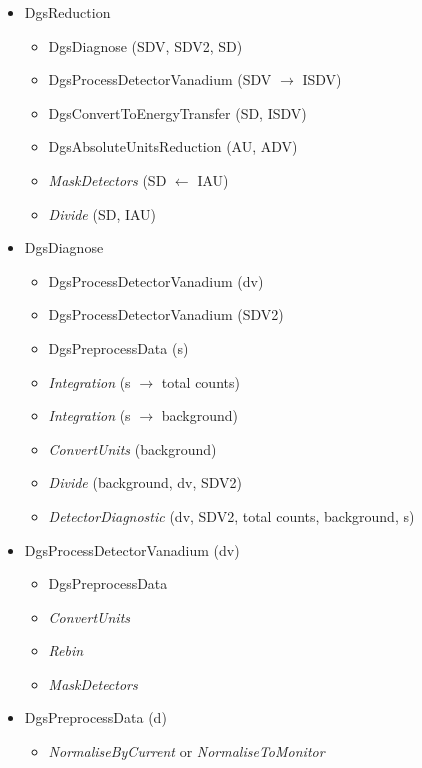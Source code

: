 \begin{itemize}
\item DgsReduction
\begin{itemize}
\item DgsDiagnose (SDV, SDV2, SD)
\item DgsProcessDetectorVanadium (SDV $\rightarrow$ ISDV)
\item DgsConvertToEnergyTransfer (SD, ISDV)
\item DgsAbsoluteUnitsReduction (AU, ADV)
\item \textit{MaskDetectors} (SD $\leftarrow$ IAU)
\item \textit{Divide} (SD, IAU)
\end{itemize}
\end{itemize}

\begin{itemize}
\item DgsDiagnose
\begin{itemize}
\item DgsProcessDetectorVanadium (dv)
\item DgsProcessDetectorVanadium (SDV2)
\item DgsPreprocessData (s)
\item \textit{Integration} (s $\rightarrow$ total counts)
\item \textit{Integration} (s $\rightarrow$ background)
\item \textit{ConvertUnits} (background)
\item \textit{Divide} (background, dv, SDV2)
\item \textit{DetectorDiagnostic} (dv, SDV2, total counts, background, s)
\end{itemize}
\end{itemize}

\begin{itemize}
\item DgsProcessDetectorVanadium (dv)
\begin{itemize}
\item DgsPreprocessData
\item \textit{ConvertUnits}
\item \textit{Rebin} 
\item \textit{MaskDetectors}
\end{itemize}
\end{itemize}

\begin{itemize}
\item DgsPreprocessData (d)
\begin{itemize}
\item \textit{NormaliseByCurrent} or \textit{NormaliseToMonitor}
\end{itemize}
\end{itemize}

